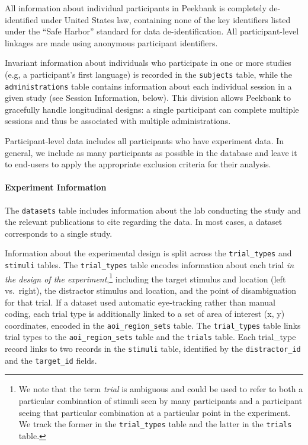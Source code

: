 \documentclass[
  english,
  man,floatsintext]{apa6}
\let\oldparagraph\paragraph
\renewcommand{\paragraph}[1]{\oldparagraph{#1}\mbox{}}
\begin{document}
All information about individual participants in Peekbank is completely de-identified under United States law, containing none of the key identifiers listed under the ``Safe Harbor'' standard for data de-identification.
All participant-level linkages are made using anonymous participant identifiers.

Invariant information about individuals who participate in one or more studies (e.g, a participant's first language) is recorded in the \texttt{subjects} table, while the \texttt{administrations} table contains information about each individual session in a given study (see Session Information, below).
This division allows Peekbank to gracefully handle longitudinal designs: a single participant can complete multiple sessions and thus be associated with multiple administrations.

Participant-level data includes all participants who have experiment data.
In general, we include as many participants as possible in the database and leave it to end-users to apply the appropriate exclusion criteria for their analysis.

\hypertarget{experiment-information}{%
\paragraph{Experiment Information}\label{experiment-information}}

The \texttt{datasets} table includes information about the lab conducting the study and the relevant publications to cite regarding the data.
In most cases, a dataset corresponds to a single study.

Information about the experimental design is split across the \texttt{trial\_types} and \texttt{stimuli} tables.
The \texttt{trial\_types} table encodes information about each trial \textit{in the design of the experiment},\footnote{We note that the term \textit{trial} is ambiguous and could be used to refer to both a particular combination of stimuli seen by many participants and a participant seeing that particular combination at a particular point in the experiment. We track the former in the \texttt{trial\_types} table and the latter in the \texttt{trials} table.} including the target stimulus and location (left vs.~right), the distractor stimulus and location, and the point of disambiguation for that trial.
If a dataset used automatic eye-tracking rather than manual coding, each trial type is additionally linked to a set of area of interest (x, y) coordinates, encoded in the \texttt{aoi\_region\_sets} table.
The \texttt{trial\_types} table links trial types to the \texttt{aoi\_region\_sets} table and the \texttt{trials} table.
Each trial\_type record links to two records in the \texttt{stimuli} table, identified by the \texttt{distractor\_id} and the \texttt{target\_id} fields.
\end{document}
